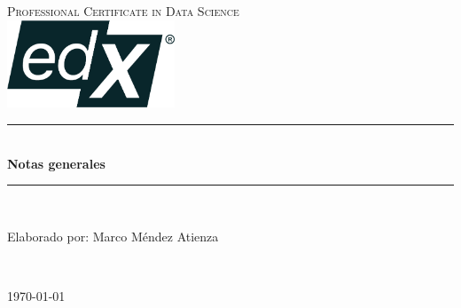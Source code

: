 \begin{titlepage}

\newcommand{\HRule}{\rule{\linewidth}{0.5mm}} 

\center 

\vfill
 
\textsc{\LARGE Professional Certificate in Data Science}\\[1.5cm] 
\includegraphics[width = 5cm]{edx.png}\\

\vfill

\HRule \\[0.4cm]
{ \huge \bfseries Notas generales}\\[0.4cm]
\HRule \\[1.5cm]

\vfill

\begin{minipage}{0.5\textwidth}
\begin{center} \large
Elaborado por: Marco Méndez Atienza\\ 
\end{center}

\vfill

\end{minipage}\\[2cm]

\vfill

{\large \today}\\[2cm] 

\vfill 

\end{titlepage}
